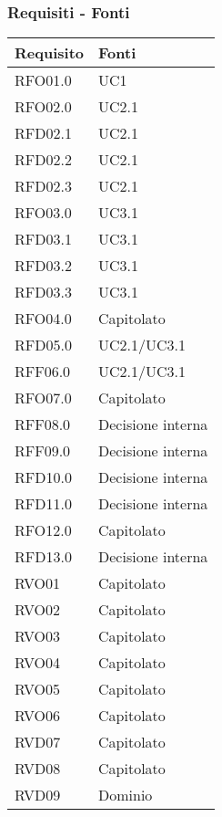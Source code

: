 \subsubsection{Requisiti - Fonti}
{
    \setlength{\freewidth}{\dimexpr\textwidth-8\tabcolsep}
    \renewcommand{\arraystretch}{1.5}
    \centering
    \setlength{\aboverulesep}{0pt}
    \setlength{\belowrulesep}{0pt}
    \begin{longtable}{C{.50\freewidth} C{.50\freewidth}}
        \toprule 
        \textbf{Requisito} & \textbf{Fonti} \\
        \toprule
        \endhead

        RFO01.0  & UC1 \\
        RFO02.0  & UC2.1 \\
        RFD02.1  & UC2.1 \\
        RFD02.2  & UC2.1 \\
        RFD02.3  & UC2.1 \\
        RFO03.0  & UC3.1 \\
        RFD03.1  & UC3.1 \\
        RFD03.2  & UC3.1 \\
        RFD03.3  & UC3.1 \\
        RFO04.0  & Capitolato \\
        RFD05.0  & UC2.1/UC3.1 \\
        RFF06.0  & UC2.1/UC3.1 \\
        RFO07.0  & Capitolato \\
        RFF08.0  & Decisione interna \\
        RFF09.0  & Decisione interna \\
        RFD10.0  & Decisione interna \\
        RFD11.0  & Decisione interna \\
        RFO12.0  & Capitolato \\
        RFD13.0  & Decisione interna \\

        RVO01    & Capitolato \\
        RVO02    & Capitolato \\
        RVO03    & Capitolato \\
        RVO04    & Capitolato \\
        RVO05    & Capitolato \\
        RVO06    & Capitolato \\
        RVD07    & Capitolato \\
        RVD08    & Capitolato \\
        RVD09    & Dominio \\


\end{longtable}}
